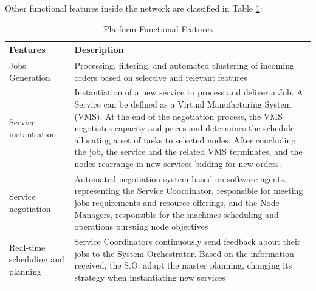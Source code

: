 Other functional features inside the network are classified in Table \ref{tab:platform-functional-features}:
\begin{table}
    \centering
    \begin{tabular}{|p{3cm}|p{6cm}|}
        \hline
        \textbf{Features} & \textbf{Description}\\
        \hline
        Jobs Generation & Processing, filtering, and automated clustering of incoming orders based on selective and relevant features \\
        \hline
        Service instantiation & Instantiation of a new service to process and deliver a Job. A Service can be defined as a Virtual Manufacturing System (VMS). At the end of the negotiation process, the VMS negotiates capacity and prices and determines the schedule allocating a set of tasks to selected nodes. After concluding the job, the service and the related VMS terminates, and the nodes rearrange in new services bidding for new orders.\\
        \hline
        Service negotiation & Automated negotiation system based on software agents. representing the Service Coordinator, responsible for meeting jobs requirements and resource offerings, and the Node Managers, responsible for the machines scheduling and operations pursuing node objectives\\
        \hline
        Real-time scheduling and planning & Service Coordinators continuously send feedback about their jobs to the System Orchestrator. Based on the information received, the S.O. adapt the master planning, changing its strategy when instantiating new services\\
        \hline
    \end{tabular}
    \caption{Platform Functional Features}
    \label{tab:platform-functional-features}
\end{table}
